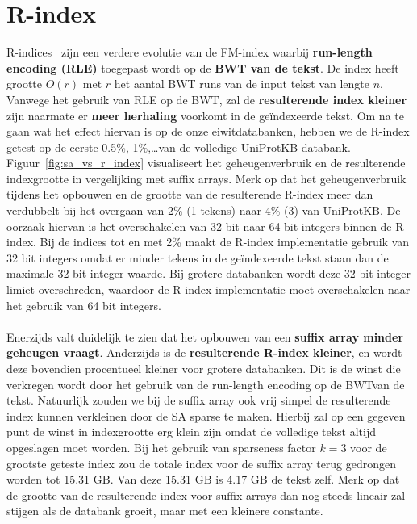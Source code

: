 \section{R-index}\label{sec:r-index}
R-indices~\cite{r_index1, r_index2} zijn een verdere evolutie van de FM-index waarbij \textbf{run-length encoding (RLE)} toegepast wordt op de \textbf{BWT van de tekst}.
De index heeft grootte $O(r)$ met $r$ het aantal BWT runs van de input tekst van lengte $n$.
Vanwege het gebruik van RLE op de BWT, zal de \textbf{resulterende index kleiner} zijn naarmate er \textbf{meer herhaling} voorkomt in de geïndexeerde tekst.
Om na te gaan wat het effect hiervan is op de onze eiwitdatabanken, hebben we de R-index getest op de eerste 0.5\%, 1\%,\ldots\space van de volledige UniProtKB databank.
Figuur~\ref{fig:sa_vs_r_index} visualiseert het geheugenverbruik en de resulterende indexgrootte in vergelijking met suffix arrays.
Merk op dat het geheugenverbruik tijdens het opbouwen en de grootte van de resulterende R-index meer dan verdubbelt bij het overgaan van 2\% (1 tekens) naar 4\% (3) van UniProtKB\@.
De oorzaak hiervan is het overschakelen van 32 bit naar 64 bit integers binnen de R-index.
Bij de indices tot en met 2\% maakt de R-index implementatie gebruik van 32 bit integers omdat er minder tekens in de geïndexeerde tekst staan dan de maximale 32 bit integer waarde.
Bij grotere databanken wordt deze 32 bit integer limiet overschreden, waardoor de R-index implementatie moet overschakelen naar het gebruik van 64 bit integers.
\\ \\
Enerzijds valt duidelijk te zien dat het opbouwen van een \textbf{suffix array minder geheugen vraagt}.
Anderzijds is de \textbf{resulterende R-index kleiner}, en wordt deze bovendien procentueel kleiner voor grotere databanken.
Dit is de winst die verkregen wordt door het gebruik van de run-length encoding op de BWT\@ van de tekst.
Natuurlijk zouden we bij de suffix array ook vrij simpel de resulterende index kunnen verkleinen door de SA sparse te maken.
Hierbij zal op een gegeven punt de winst in indexgrootte erg klein zijn omdat de volledige tekst altijd opgeslagen moet worden.
Bij het gebruik van sparseness factor $k = 3$ voor de grootste geteste index zou de totale index voor de suffix array terug gedrongen worden tot 15.31 GB\@.
Van deze 15.31 GB is 4.17 GB de tekst zelf.
Merk op dat de grootte van de resulterende index voor suffix arrays dan nog steeds lineair zal stijgen als de databank groeit, maar met een kleinere constante.
